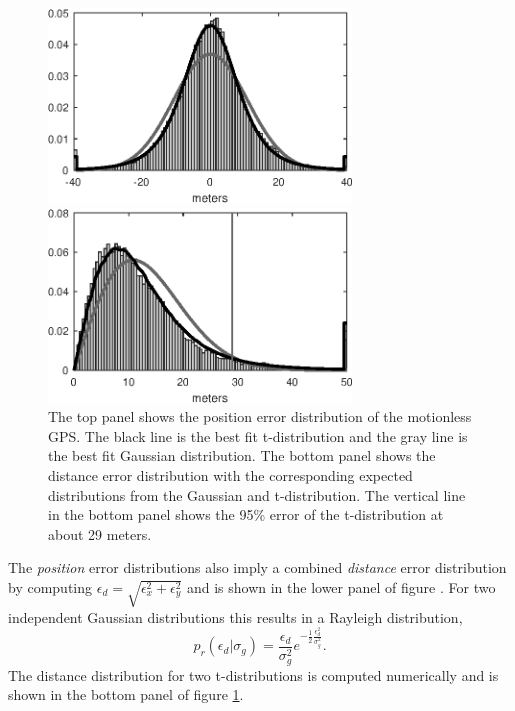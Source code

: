 \documentclass[twocol]{ametsoc}
\begin{document}
\begin{figure}
  \centerline{\includegraphics[width=19pc,angle=0]{motionless_error}}
  \centerline{\includegraphics[width=19pc,angle=0]{motionless_distance_error}} 
  \caption{The top panel shows the position error distribution of the motionless GPS. The black line is the best fit t-distribution and the gray line is the best fit Gaussian distribution. The bottom panel shows the distance error distribution with the corresponding expected distributions from the Gaussian and t-distribution. The vertical line in the bottom panel shows the 95\% error of the t-distribution at about 29 meters.}
  \label{motionless_error}
\end{figure}

The \emph{position} error distributions also imply a combined \emph{distance} error distribution by computing $\epsilon_d = \sqrt{\epsilon_x^2 + \epsilon_y^2}$ and is shown in the lower panel of figure  \label{motionless_error}. For two independent Gaussian distributions this results in a Rayleigh distribution,
\begin{equation}
\label{rayleigh_pdf}
p_r(\epsilon_d|\sigma_g) = \frac{\epsilon_d}{\sigma_g^2 } e^{-\frac{1}{2}\frac{\epsilon_d^2}{\sigma_g^2}}.
\end{equation}
The distance distribution for two t-distributions is computed numerically and is shown in the bottom panel of figure \ref{motionless_error}.
\end{document}

